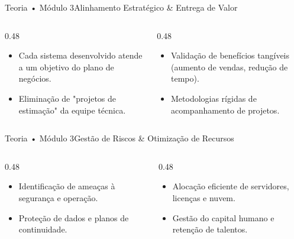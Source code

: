 \begin{senaiframe}{Teoria • Módulo 3}{Alinhamento Estratégico \& Entrega de Valor}
  \begin{columns}[t]
    \begin{column}{0.48\textwidth}
      \begin{tcolorbox}[senaigreencard, title={Garantia de Alinhamento}]
        \begin{itemize}
          \item Cada sistema desenvolvido atende a um objetivo do plano de negócios.
          \item Eliminação de "projetos de estimação" da equipe técnica.
        \end{itemize}
      \end{tcolorbox}
    \end{column}
    \begin{column}{0.48\textwidth}
      \begin{tcolorbox}[senaibluecard, title={Foco na Entrega}]
        \begin{itemize}
          \item Validação de benefícios tangíveis (aumento de vendas, redução de tempo).
          \item Metodologias rígidas de acompanhamento de projetos.
        \end{itemize}
      \end{tcolorbox}
    \end{column}
  \end{columns}
\end{senaiframe}

\begin{senaiframe}{Teoria • Módulo 3}{Gestão de Riscos \& Otimização de Recursos}
  \begin{columns}[t]
    \begin{column}{0.48\textwidth}
      \begin{tcolorbox}[senairedcard, title={Mitigação de Riscos}]
        \begin{itemize}
          \item Identificação de ameaças à segurança e operação.
          \item Proteção de dados e planos de continuidade.
        \end{itemize}
      \end{tcolorbox}
    \end{column}
    \begin{column}{0.48\textwidth}
      \begin{tcolorbox}[senaicard, title={Otimização de Recursos}]
        \begin{itemize}
          \item Alocação eficiente de servidores, licenças e nuvem.
          \item Gestão do capital humano e retenção de talentos.
        \end{itemize}
      \end{tcolorbox}
    \end{column}
  \end{columns}
\end{senaiframe}

